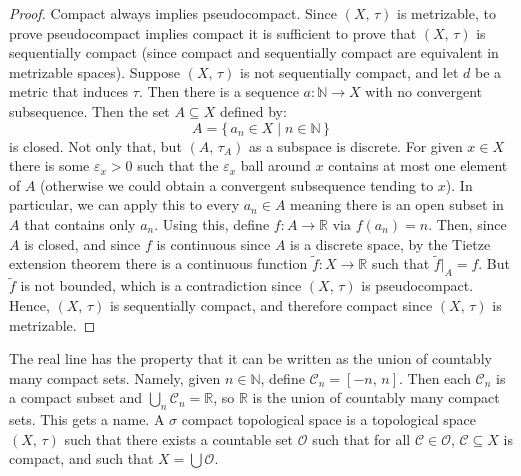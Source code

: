 \documentclass{article}
\theoremstyle{plain}
\theoremstyle{normal}
\newenvironment{definition}{%
    \pushQED{\qed}\renewcommand{\qedsymbol}{$\blacksquare$}\definitionx%
}{%
    \popQED\enddefinitionx%
}
\begin{document}
        \begin{proof}
            Compact always implies pseudocompact. Since $(X,\,\tau)$ is
            metrizable, to prove pseudocompact implies compact it is sufficient
            to prove that $(X,\,\tau)$ is sequentially compact
            (since compact and sequentially compact are equivalent in
            metrizable spaces). Suppose $(X,\,\tau)$ is not sequentially
            compact, and let $d$ be a metric that induces $\tau$. Then there is
            a sequence $a:\mathbb{N}\rightarrow{X}$ with no convergent
            subsequence. Then the set $A\subseteq{X}$ defined by:
            \begin{equation}
                A=\{\,a_{n}\in{X}\;|\;n\in\mathbb{N}\,\}
            \end{equation}
            is closed. Not only that, but $(A,\,\tau_{A})$ as a subspace is
            discrete. For given $x\in{X}$ there is some $\varepsilon_{x}>0$ such
            that the $\varepsilon_{x}$ ball around $x$ contains at most one element
            of $A$ (otherwise we could obtain a convergent subsequence tending
            to $x$). In particular, we can apply this to every $a_{n}\in{A}$
            meaning there is an open subset in $A$ that contains only $a_{n}$.
            Using this, define $f:A\rightarrow\mathbb{R}$ via
            $f(a_{n})=n$. Then, since $A$ is closed, and since $f$ is
            continuous since $A$ is a discrete space, by the Tietze extension
            theorem there is a
            continuous function $\tilde{f}:X\rightarrow\mathbb{R}$ such that
            $\tilde{f}|_{A}=f$. But $\tilde{f}$ is not bounded, which is a
            contradiction since $(X,\,\tau)$ is pseudocompact. Hence,
            $(X,\,\tau)$ is sequentially compact, and therefore compact
            since $(X,\,\tau)$ is metrizable.
        \end{proof}
        The real line has the property that it can be written as the union
        of countably many compact sets. Namely, given $n\in\mathbb{N}$, define
        $\mathcal{C}_{n}=[-n,\,n]$. Then each $\mathcal{C}_{n}$ is a compact
        subset and $\bigcup_{n}\mathcal{C}_{n}=\mathbb{R}$, so $\mathbb{R}$ is
        the union of countably many compact sets. This gets a name. 
        \begin{definition}[\textbf{$\sigma$ Compact Topological Space}]
            A $\sigma$ compact topological space is a topological space
            $(X,\,\tau)$ such that there exists a countable set
            $\mathcal{O}$ such that for all $\mathcal{C}\in\mathcal{O}$,
            $\mathcal{C}\subseteq{X}$ is compact, and such that
            $X=\bigcup\mathcal{O}$.
        \end{definition}
\end{document}
